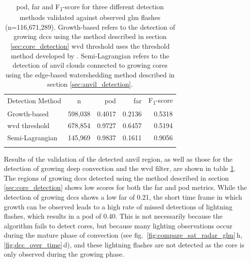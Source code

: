 \begin{table}[tb]
\centering
\begin{tabular}{lcrrr}
\tophline
Detection Method            & n         & \acrshort{pod}    & \acrshort{far}    & F\textsubscript{1}-score \\ 
\middlehline
Growth-based                & 598,038   & 0.4017            & 0.2136            & 0.5318  \\
\acrshort{wvd} threshold    & 678,854   & 0.9727            & 0.6457            & 0.5194  \\
Semi-Lagrangian             & 145,969   & 0.9837            & 0.1611            & 0.9056 \\
\bottomhline
\end{tabular}
\caption[
\acrshort{pod}, \acrshort{far} and F\textsubscript{1}-score for three different detection methods validated against observed \acrshort{glm} flashes
]{
\acrshort{pod}, \acrshort{far} and F\textsubscript{1}-score for three different detection methods validated against observed \acrshort{glm} flashes (n=116,671,289). Growth-based refers to the detection of growing \acrshort{dcc}s using the method described in section \ref{sec:core_detection} \acrshort{wvd} threshold uses the threshold method developed by \citet{muller_role_2018}. Semi-Lagrangian refers to the detection of anvil clouds connected to growing cores using the edge-based watershedding method described in section \ref{sec:anvil_detection}.
} %
\label{table:validation}
\end{table}


Results of the validation of the detected anvil region, as well as those for the detection of growing deep convection and the \acrshort{wvd} filter, are shown in table \ref{table:validation}.
The regions of growing \acrshort{dcc}s detected using the method described in section \ref{sec:core_detection} shows low scores for both the \acrshort{far} and \acrshort{pod} metrics.
While the detection of growing \acrshort{dcc}s shows a low \acrshort{far} of 0.21, the short time frame in which growth can be observed leads to a high rate of missed detections of lightning flashes, which results in a \acrshort{pod} of 0.40.
This is not necessarily because the algorithm fails to detect cores, but because many lighting observations occur during the mature phase of convection (see fig.~\ref{fig:compare_sat_radar_glm}\,h, \ref{fig:dcc_over_time}\,d), and these lightning flashes are not detected as the core is only observed during the growing phase.

